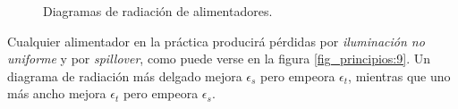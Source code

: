 \begin{figure} [H]
\centering 
{}
\hspace{5mm}
\caption{Diagramas de radiación de alimentadores.}
\label{grup_fig_principios:2}
\end{figure}
Cualquier alimentador en la práctica producirá pérdidas por \emph{iluminación no uniforme} y por \emph{spillover}, como puede verse en la figura \ref{fig_principios:9}. Un diagrama de radiación más delgado mejora $\epsilon_s$ pero empeora $\epsilon_t$, mientras que uno más ancho mejora $\epsilon_t$ pero empeora $\epsilon_s$.
